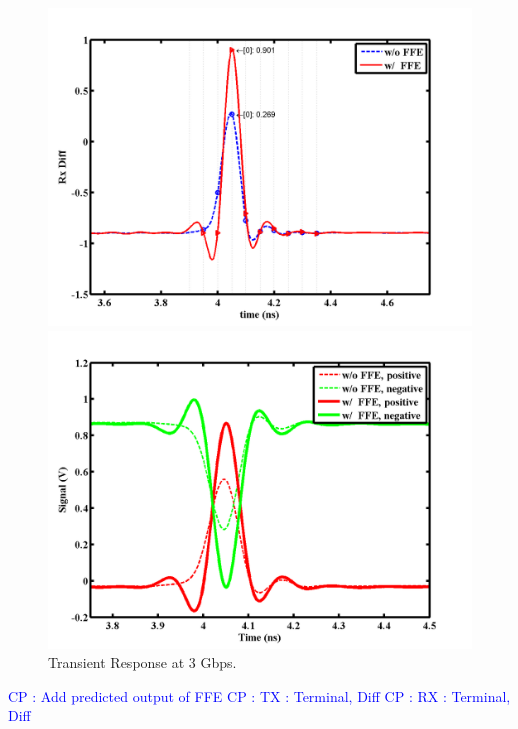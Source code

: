 \documentclass{book}  %
\newcommand{\cphighlight}[1]{\Huge\textcolor{blue}{CP : #1}\normalsize}
\begin{document}
\begin{paper}
\begin{figure}[htbp!]
	\ContinuedFloat
	\begin{minipage}[tb]{0.5\textwidth}
		\centering	
		\includegraphics[width=\textwidth]{./img/Verilog/20G/2_diff.png}
	\end{minipage}%
	\begin{minipage}[tb]{0.5\textwidth}
		\centering	
		\includegraphics[width=\textwidth]{./img/Verilog/20G/2.png}
	\end{minipage}%
	\caption{Transient Response at 3 Gbps.}
\end{figure}
\cphighlight{Add predicted output of FFE}
\cphighlight{TX : Terminal, Diff}
\cphighlight{RX : Terminal, Diff}


\end{paper}
\end{document}
